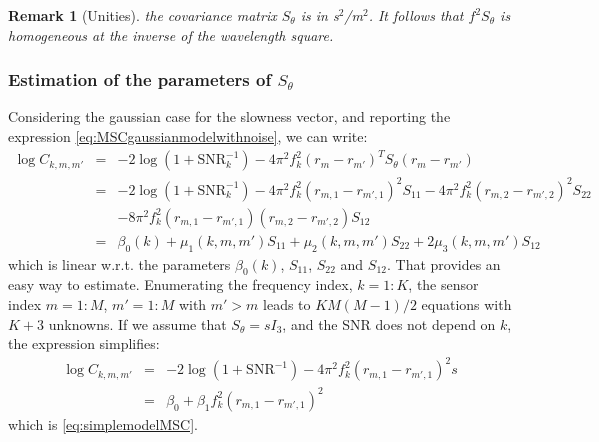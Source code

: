\documentclass[a4paper, 12pt]{report}
\newtheorem{remark}{Remark}
\def\SNR{\mathrm{SNR}}
\begin{document}
\begin{remark}[Unities]
the covariance matrix $S_{\theta}$ is in s$^2$/m$^2$. It follows that $f^2 S_{\theta}$ is homogeneous at the inverse of the wavelength square.
\end{remark}


\subsubsection{Estimation of the parameters of $S_{\theta}$}
Considering the gaussian case for the slowness vector, and reporting the expression \eqref{eq:MSCgaussianmodelwithnoise}, we can write: 
\begin{eqnarray*}
 \log C_{k,m,m'} &=&
-2\log(1+\SNR_k^{-1})
-4\pi^{2} f_{k}^{2}(r_{m}-r_{m'})^{T}S_{\theta}(r_{m}-r_{m'})
 \\
 &=&
-2\log(1+\SNR_k^{-1})
-4\pi^{2} f_{k}^{2}(r_{m,1}-r_{m',1})^{2}S_{11}
-4\pi^{2} f_{k}^{2}(r_{m,2}-r_{m',2})^{2}S_{22}
\\&&
-8\pi^{2} f_{k}^{2}(r_{m,1}-r_{m',1})(r_{m,2}-r_{m',2})S_{12}
\\
&=&
\beta_{0}(k)
+\mu_{1}(k,m,m')S_{11}
+\mu_{2}(k,m,m')S_{22}
+2\mu_{3}(k,m,m')S_{12}
\end{eqnarray*}
which is linear w.r.t. the parameters $\beta_{0}(k)$, $S_{11}$, $S_{22}$ and $S_{12}$. That provides an easy way to estimate.
Enumerating the frequency index, $k=1:K$, the sensor index $m=1:M$, $m'=1:M$ with $m'>m$ leads to $KM(M-1)/2$ equations with $K+3$ unknowns.
If we assume that $S_{\theta}=sI_3$, and the SNR does not depend on $k$, the expression simplifies:
\begin{eqnarray*}
 \log C_{k,m,m'} &=&
-2\log(1+\SNR^{-1})
-4\pi^{2} f_{k}^{2}(r_{m,1}-r_{m',1})^{2}s
\\
&=&\beta_{0}+\beta_{1}f_{k}^{2}(r_{m,1}-r_{m',1})^{2}
\end{eqnarray*}
which is \eqref{eq:simplemodelMSC}.
\end{document}
